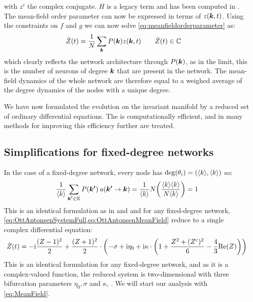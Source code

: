 with $z^c$ the complex conjugate. $H$ is a legacy term and has been computed in \cite{Martens2020}.
The mean-field order parameter can now be expressed in terms of $z({\boldsymbol{k}},t)$. Using the constraints on $f$ and $g$ we can now solve \eqref{eq:meanfieldorderparameter} as:
\begin{align}
\bar{Z}(t) &= \frac{1}{N} \sum_{{\boldsymbol{k}}} P({\boldsymbol{k}}) z({\boldsymbol{k}}, t) \qquad \bar{Z}(t) \in {\mathbb{C}} \label{eq:OttAntonsenMeanField}
\end{align}
which clearly reflects the network architecture through $P({\boldsymbol{k}})$, as in the limit, this is the number of neurons of degree ${\boldsymbol{k}}$ that are present in the network. The mean-field dynamics of the whole network are therefore equal to a weighed average of the degree dynamics of the nodes with a unique degree. 

We have now formulated the evolution on the invariant manifold by a reduced set of ordinary differential equations. The \MFR is computationally efficient, and in \cite{OttAntonsen2017} many methods for improving this efficiency further are treated.


\subsection{Simplifications for fixed-degree networks}
In the case of a fixed-degree network, every node has $\deg (\theta_i) = ({\langle k\rangle}, {\langle k\rangle})$ so:
\begin{align*}
    \frac{1}{\kmean} \sum_{\kacc \in \K} P\left(\kacc\right) \: a\left(\kacc \rightarrow \k\right) = \frac{1}{\kmean} N \left( \frac{\kmean \kmean}{N \kmean} \right) = 1
\end{align*}
This is an identical formulation as in \cite{Luke2013} and \cite{Martens2020} and for any fixed-degree network, \cref{eq:OttAntonsenSystemFull,eq:OttAntonsenMeanField} reduce to a single complex differential equation:
\begin{align}
\dot{Z}(t)= -\ic \frac{(Z-1)^2}{2}+\frac{(Z+1)^2}{2} \cdot \left(-\sigma+ \ic\eta_{0}
+ \ic \kappa \cdot \left(1+\frac{Z^{2} + (Z^c)^{2} }{6} - \frac{4}{3} \Re(Z)\right)\right) \label{eq:MeanField}
\end{align}
This is an identical formulation for any fixed-degree network, and as it is a complex-valued function, the reduced system is two-dimensional with three bifurcation parameters $\eta_0, \sigma$ and $\kappa$, \cite{Luke2013, Martens2020}. We will start our analysis with \eqref{eq:MeanField}.\\

